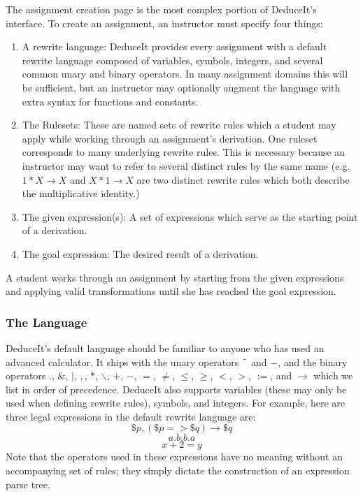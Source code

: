 \documentclass{sigchi}
\begin{document}
The assignment creation page is the most complex portion of DeduceIt's interface. To create an assignment, an instructor must specify four things: 
  \begin{enumerate}
  \item A rewrite language: DeduceIt provides every assignment with a default rewrite language composed of variables, symbols, integers, and several common unary and binary operators. In many assignment domains this will be sufficient, but an instructor may optionally augment the language with extra syntax for functions and constants. 
  \item The Rulesets: These are named sets of rewrite rules which a student may apply while working through an assignment's derivation. One ruleset corresponds to many underlying rewrite rules. This is necessary because an instructor may want to refer to several distinct rules by the same name (e.g. $1*X \rightarrow X$ and $X*1 \rightarrow X$ are two distinct rewrite rules which both describe the multiplicative identity.)
  \item The given expression(s): A set of expressions which serve as the starting point of a derivation.
  \item The goal expression: The desired result of a derivation.
  \end{enumerate}

A student works through an assignment by starting from the given expressions and applying valid transformations until she has reached the goal expression.

\subsubsection{The Language}

DeduceIt's default language should be familiar to anyone who has used an advanced calculator. It ships with the unary operators $\char`\~$ and $-$, and the binary operators $.$, $\&$, $|$, $,$, $*$, $\backslash$, $+$, $-$, $=$, $\neq$, $\leq$, $\geq$, $<$, $>$, $:=$, and $\rightarrow$ which we list in order of precedence. DeduceIt also supports variables (these may only be used when defining rewrite rules), symbols, and integers. For example, here are three legal expressions in the default rewrite language are: 
$$\$p,(\$p=>\$q)\rightarrow{}\$q$$ 
$$a.b.b.a$$
$$x+2=y$$ 
Note that the operators used in these expressions have no meaning without an accompanying set of rules; they simply dictate the construction of an expression parse tree.
\end{document}
